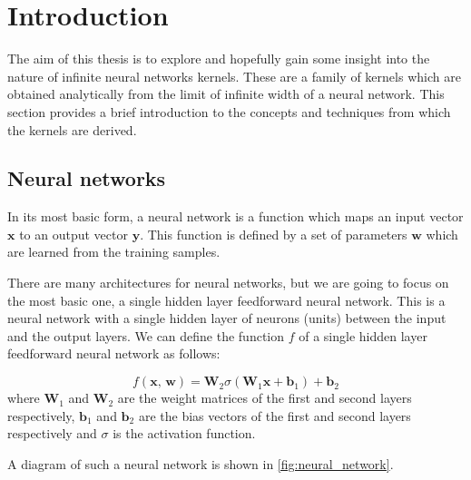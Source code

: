 \section{Introduction}%
\label{sec:introduction}

The aim of this thesis is to explore and hopefully gain some insight into the
nature of infinite neural networks kernels. These are a family of kernels
which are obtained analytically from the limit of infinite width of a neural network.
This section provides a brief introduction to the concepts and techniques from which
the kernels are derived.

\subsection{Neural networks}%
\label{sub:neural_networks}

In its most basic form, a neural network is a function which maps an input vector
$\textbf{x}$ to an output vector $\textbf{y}$. This function is defined by a set of
parameters $\textbf{w}$ which are learned from the training samples.

There are many architectures for neural networks, but we are going to focus
on the most basic one, a single hidden layer feedforward neural network. This is a
neural network with a single hidden layer of neurons (units) between the input and
the output layers. We can define the function $f$ of a single hidden layer feedforward
neural network as follows:

\begin{equation}
    f(\textbf{x},\,\textbf{w}) = \textbf{W}_2 \sigma \left( \textbf{W}_1 \textbf{x} + \textbf{b}_1 \right) + \textbf{b}_2
\end{equation}
where $\textbf{W}_1$ and $\textbf{W}_2$ are the weight matrices of the first and second layers respectively,
$\textbf{b}_1$ and $\textbf{b}_2$ are the bias vectors of the first and second layers respectively and
$\sigma$ is the activation function.

A diagram of such a neural network is shown in \cref{fig:neural_network}.


